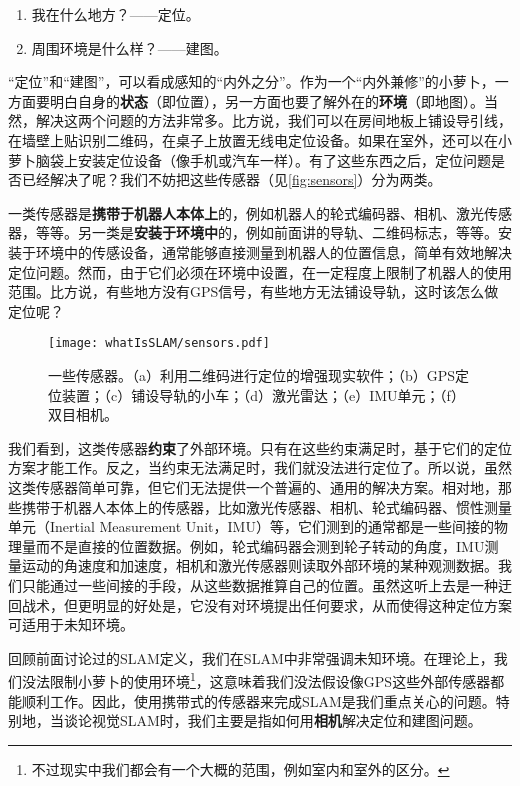 \begin{enumerate}
	\item 我在什么地方？——定位。
	\item 周围环境是什么样？——建图。
\end{enumerate}

“定位”和“建图”，可以看成感知的“内外之分”。作为一个“内外兼修”的小萝卜，一方面要明白自身的\textbf{状态}（即位置），另一方面也要了解外在的\textbf{环境}（即地图）。当然，解决这两个问题的方法非常多。比方说，我们可以在房间地板上铺设导引线，在墙壁上贴识别二维码，在桌子上放置无线电定位设备。如果在室外，还可以在小萝卜脑袋上安装定位设备（像手机或汽车一样）。有了这些东西之后，定位问题是否已经解决了呢？我们不妨把这些传感器（见\autoref{fig:sensors}）分为两类。

一类传感器是\textbf{携带于机器人本体上}的，例如机器人的轮式编码器、相机、激光传感器，等等。另一类是\textbf{安装于环境中}的，例如前面讲的导轨、二维码标志，等等。安装于环境中的传感设备，通常能够直接测量到机器人的位置信息，简单有效地解决定位问题。然而，由于它们必须在环境中设置，在一定程度上限制了机器人的使用范围。比方说，有些地方没有GPS信号，有些地方无法铺设导轨，这时该怎么做定位呢？

\begin{figure}[!ht]
	\centering
	\texttt{[image: whatIsSLAM/sensors.pdf]}
	\caption{一些传感器。（a）利用二维码进行定位的增强现实软件；（b）GPS定位装置；（c）铺设导轨的小车；（d）激光雷达；（e）IMU单元；（f）双目相机。}
	\label{fig:sensors}
\end{figure}

我们看到，这类传感器\textbf{约束}了外部环境。只有在这些约束满足时，基于它们的定位方案才能工作。反之，当约束无法满足时，我们就没法进行定位了。所以说，虽然这类传感器简单可靠，但它们无法提供一个普遍的、通用的解决方案。相对地，那些携带于机器人本体上的传感器，比如激光传感器、相机、轮式编码器、惯性测量单元（Inertial Measurement Unit，IMU）等，它们测到的通常都是一些间接的物理量而不是直接的位置数据。例如，轮式编码器会测到轮子转动的角度，IMU测量运动的角速度和加速度，相机和激光传感器则读取外部环境的某种观测数据。我们只能通过一些间接的手段，从这些数据推算自己的位置。虽然这听上去是一种迂回战术，但更明显的好处是，它没有对环境提出任何要求，从而使得这种定位方案可适用于未知环境。

\clearpage
回顾前面讨论过的SLAM定义，我们在SLAM中非常强调未知环境。在理论上，我们没法限制小萝卜的使用环境\footnote{不过现实中我们都会有一个大概的范围，例如室内和室外的区分。}，这意味着我们没法假设像GPS这些外部传感器都能顺利工作。因此，使用携带式的传感器来完成SLAM是我们重点关心的问题。特别地，当谈论视觉SLAM时，我们主要是指如何用\textbf{相机}解决定位和建图问题。

